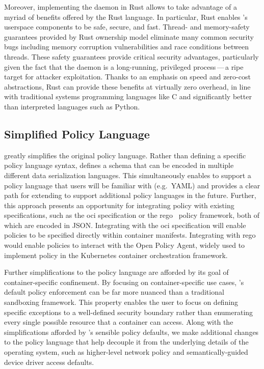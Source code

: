 Moreover, implementing the \bpfcontain{} daemon in Rust allows \bpfcontain{} to take
advantage of a myriad of benefits offered by the Rust language. In particular, Rust
enables \bpfcontain{}'s userspace components to be safe, secure, and fast. Thread- and
memory-safety guarantees provided by Rust ownership model eliminate many common security
bugs including memory corruption vulnerabilities and race conditions between threads.
These safety guarantees provide critical security advantages, particularly given the fact
that the \bpfcontain{} daemon is a long-running, privileged process\,---\,a ripe target
for attacker exploitation. Thanks to an emphasis on speed and zero-cost abstractions, Rust
can provide these benefits at virtually zero overhead, in line with traditional systems
programming languages like C and significantly better than interpreted languages such as
Python.

\subsection{Simplified Policy Language}%
\label{ss:bpfcontain-simplified}


\bpfcontain{} greatly simplifies the original \bpfbox{} policy language. Rather than
defining a specific policy language syntax, \bpfcontain{} defines a schema that can be
encoded in multiple different data serialization languages.  This simultaneously enables
\bpfcontain{} to support a policy language that users will be familiar with (e.g.\ YAML)
and provides a clear path for extending \bpfcontain{} to support additional policy
languages in the future. Further, this approach presents an opportunity for integrating
\bpfcontain{} policy with existing specifications, such as the \gls{oci} specification or
the rego~\cite{rego} policy framework, both of which are encoded in JSON\@. Integrating
with the \gls{oci} specification will enable \bpfcontain{} policies to be specified
directly within container manifests. Integrating with rego would enable \bpfcontain{}
policies to interact with the Open Policy Agent, widely used to implement policy in the
Kubernetes container orchestration framework.

Further simplifications to the \bpfcontain{} policy language are afforded by its goal of
container-specific confinement. By focusing on container-specific use cases,
\bpfcontain{}'s default policy enforcement can be far more nuanced than a traditional
sandboxing framework. This property enables the user to focus on defining specific
exceptions to a well-defined security boundary rather than enumerating every single
possible resource that a container can access. Along with the simplifications afforded by
\bpfcontain{}'s sensible policy defaults, we make additional changes to the policy
language that help decouple it from the underlying details of the operating system, such
as higher-level network policy and semantically-guided device driver access defaults.

